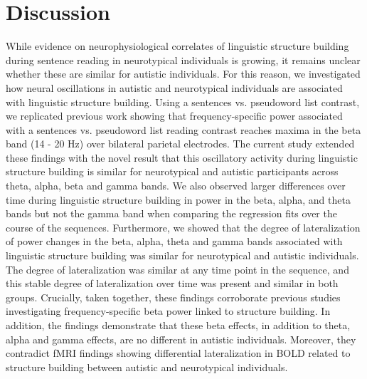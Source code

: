 \section{Discussion}
While evidence on neurophysiological correlates of linguistic structure building during sentence reading in neurotypical individuals is growing, it remains unclear whether these are similar for autistic individuals. For this reason, we investigated how neural oscillations in autistic and neurotypical individuals are associated with linguistic structure building. Using a sentences vs. pseudoword list contrast, we replicated previous work showing that frequency-specific power associated with a sentences vs. pseudoword list reading contrast reaches maxima in the beta band (14 - 20 Hz) over bilateral parietal electrodes. The current study extended these findings with the novel result that this oscillatory activity during linguistic structure building is similar for neurotypical and autistic participants across theta, alpha, beta and gamma bands. We also observed larger differences over time during linguistic structure building in power in the beta, alpha, and theta bands but not the gamma band when comparing the regression fits over the course of the sequences. Furthermore, we showed that the degree of lateralization of power changes in the beta, alpha, theta and gamma bands associated with linguistic structure building was similar for neurotypical and autistic individuals. The degree of lateralization was similar at any time point in the sequence, and this stable degree of lateralization over time was present and similar in both groups. Crucially, taken together, these findings corroborate previous studies investigating frequency-specific beta power linked to structure building. In addition, the findings demonstrate that these beta effects, in addition to theta, alpha and gamma effects, are no different in autistic individuals. Moreover, they contradict fMRI findings \citep{jouravlev2020} showing differential lateralization in BOLD related to structure building between autistic and neurotypical individuals.

